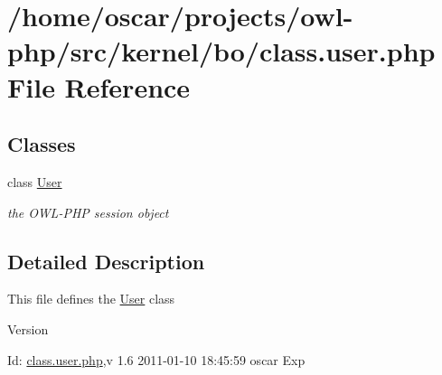 \section{/home/oscar/projects/owl-\/php/src/kernel/bo/class.user.php File Reference}
\label{class_8user_8php}
\subsection*{Classes}
\begin{DoxyCompactItemize}
\item 
class \hyperlink{classUser}{User}
\begin{DoxyCompactList}\small\item\em the OWL-\/PHP session object \item\end{DoxyCompactList}\end{DoxyCompactItemize}


\subsection{Detailed Description}
This file defines the \hyperlink{classUser}{User} class \begin{DoxyVersion}{Version}

\end{DoxyVersion}
\begin{DoxyParagraph}{Id:}
\hyperlink{class_8user_8php}{class.user.php},v 1.6 2011-\/01-\/10 18:45:59 oscar Exp 
\end{DoxyParagraph}

